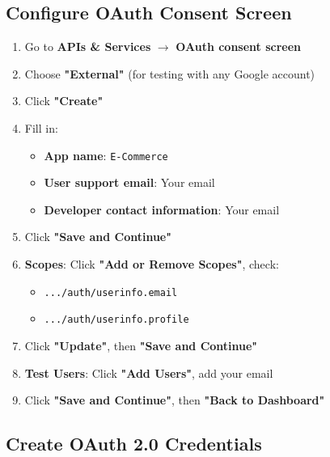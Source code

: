 \documentclass[12pt,a4paper]{article}
\begin{document}
\subsection{Configure OAuth Consent Screen}

\begin{enumerate}[leftmargin=*,itemsep=0.5em]
    \item Go to \textbf{APIs \& Services} $\rightarrow$ \textbf{OAuth consent screen}
    \item Choose \textbf{"External"} (for testing with any Google account)
    \item Click \textbf{"Create"}
    \item Fill in:
    \begin{itemize}
        \item \textbf{App name}: \texttt{E-Commerce}
        \item \textbf{User support email}: Your email
        \item \textbf{Developer contact information}: Your email
    \end{itemize}
    \item Click \textbf{"Save and Continue"}
    \item \textbf{Scopes}: Click \textbf{"Add or Remove Scopes"}, check:
    \begin{itemize}
        \item \texttt{.../auth/userinfo.email}
        \item \texttt{.../auth/userinfo.profile}
    \end{itemize}
    \item Click \textbf{"Update"}, then \textbf{"Save and Continue"}
    \item \textbf{Test Users}: Click \textbf{"Add Users"}, add your email
    \item Click \textbf{"Save and Continue"}, then \textbf{"Back to Dashboard"}
\end{enumerate}

\subsection{Create OAuth 2.0 Credentials}
\end{document}
